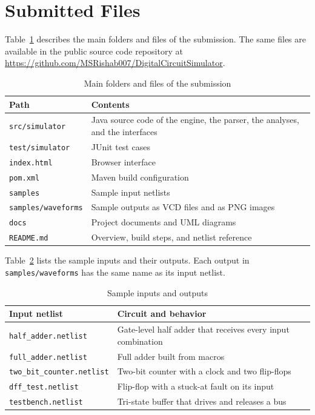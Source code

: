 \section{Submitted Files}

Table~\ref{tab:files} describes the main folders and files of the submission.
The same files are available in the public source code repository at \url{https://github.com/MSRishab007/DigitalCircuitSimulator}.

\begin{table}[H]
\centering
\small
\caption{Main folders and files of the submission}
\label{tab:files}
\begin{tabular}{>{\raggedright\arraybackslash}p{4.6cm}>{\raggedright\arraybackslash}p{10.4cm}}
\toprule
\textbf{Path} & \textbf{Contents} \\
\midrule
\texttt{src/simulator} & Java source code of the engine, the parser, the analyses, and the interfaces \\
\texttt{test/simulator} & JUnit test cases \\
\texttt{index.html} & Browser interface \\
\texttt{pom.xml} & Maven build configuration \\
\texttt{samples} & Sample input netlists \\
\texttt{samples/waveforms} & Sample outputs as VCD files and as PNG images \\
\texttt{docs} & Project documents and UML diagrams \\
\texttt{README.md} & Overview, build steps, and netlist reference \\
\bottomrule
\end{tabular}
\end{table}

Table~\ref{tab:samples} lists the sample inputs and their outputs.
Each output in \texttt{samples/waveforms} has the same name as its input netlist.

\begin{table}[H]
\centering
\small
\caption{Sample inputs and outputs}
\label{tab:samples}
\begin{tabular}{>{\raggedright\arraybackslash}p{4.6cm}>{\raggedright\arraybackslash}p{10.4cm}}
\toprule
\textbf{Input netlist} & \textbf{Circuit and behavior} \\
\midrule
\texttt{half\_adder.netlist} & Gate-level half adder that receives every input combination \\
\texttt{full\_adder.netlist} & Full adder built from macros \\
\texttt{two\_bit\_counter.netlist} & Two-bit counter with a clock and two flip-flops \\
\texttt{dff\_test.netlist} & Flip-flop with a stuck-at fault on its input \\
\texttt{testbench.netlist} & Tri-state buffer that drives and releases a bus \\
\bottomrule
\end{tabular}
\end{table}
